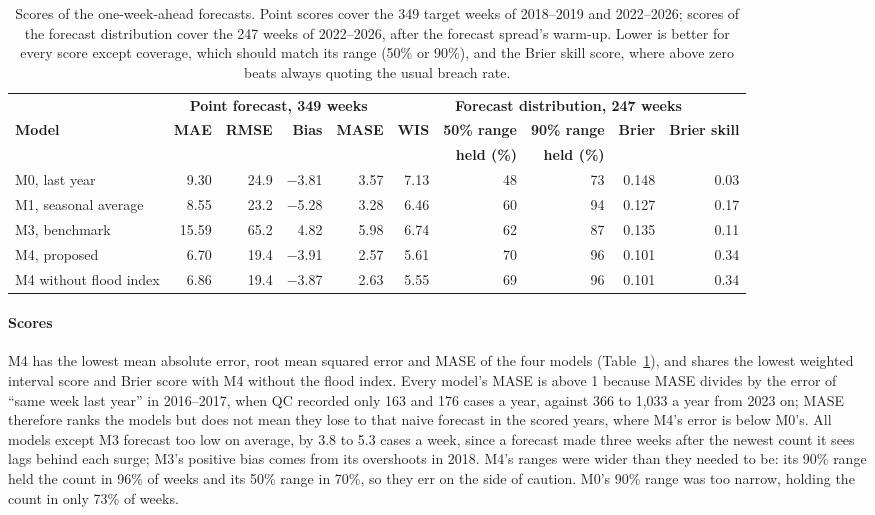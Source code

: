 \begin{table}[t]
\centering\footnotesize
\setlength{\tabcolsep}{5pt}
\caption{Scores of the one-week-ahead forecasts. Point scores cover the 349 target weeks of
2018--2019 and 2022--2026; scores of the forecast distribution cover the 247 weeks of
2022--2026, after the forecast spread's warm-up. Lower is better for every score except
coverage, which should match its range (50\% or 90\%), and the Brier skill score, where above
zero beats always quoting the usual breach rate.}\label{tab:scores}
\begin{tabular}{@{}l rrrr rrrrr@{}}
\toprule
 & \multicolumn{4}{c}{\textbf{Point forecast, 349 weeks}}
 & \multicolumn{5}{c}{\textbf{Forecast distribution, 247 weeks}} \\
\cmidrule(lr){2-5}\cmidrule(l){6-10}
\textbf{Model} & \textbf{MAE} & \textbf{RMSE} & \textbf{Bias} & \textbf{MASE}
 & \textbf{WIS} & \textbf{50\% range} & \textbf{90\% range} & \textbf{Brier} & \textbf{Brier skill} \\
 & & & & & & \textbf{held (\%)} & \textbf{held (\%)} & & \\
\midrule
M0, last year & 9.30 & 24.9 & $-$3.81 & 3.57 & 7.13 & 48 & 73 & 0.148 & 0.03 \\
M1, seasonal average & 8.55 & 23.2 & $-$5.28 & 3.28 & 6.46 & 60 & 94 & 0.127 & 0.17 \\
M3, benchmark & 15.59 & 65.2 & 4.82 & 5.98 & 6.74 & 62 & 87 & 0.135 & 0.11 \\
M4, proposed & 6.70 & 19.4 & $-$3.91 & 2.57 & 5.61 & 70 & 96 & 0.101 & 0.34 \\
M4 without flood index & 6.86 & 19.4 & $-$3.87 & 2.63 & 5.55 & 69 & 96 & 0.101 & 0.34 \\
\bottomrule
\end{tabular}
\end{table}

\paragraph{Scores}
M4 has the lowest mean absolute error, root mean squared error and MASE of the four models
(Table~\ref{tab:scores}), and shares the lowest weighted interval score and Brier score with M4
without the flood index. Every model's MASE is above 1 because MASE divides by the error of ``same week
last year'' in 2016--2017, when QC recorded only 163 and 176 cases a year, against 366 to 1,033
a year from 2023 on; MASE therefore ranks the models but does not mean they lose to that naive
forecast in the scored years, where M4's error is below M0's. All models except M3 forecast too
low on average, by 3.8 to 5.3 cases a week, since a forecast made three weeks after the newest
count it sees lags behind each surge; M3's positive bias comes from its overshoots in 2018. M4's
ranges were wider than they needed to be: its 90\% range held the count in 96\% of weeks and
its 50\% range in 70\%, so they err on the side of caution. M0's 90\% range was too narrow,
holding the count in only 73\% of weeks.

